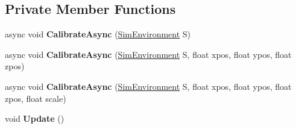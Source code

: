 \subsection*{Private Member Functions}
\begin{DoxyCompactItemize}
\item 
\mbox{\label{class_pozyx_positioner_1_1_framework_1_1_sim_object_ab0d578085cfad50b5e864a172b1254d0}} 
async void {\bfseries Calibrate\+Async} (\hyperlink{class_pozyx_positioner_1_1_framework_1_1_sim_environment}{Sim\+Environment} S)
\item 
\mbox{\label{class_pozyx_positioner_1_1_framework_1_1_sim_object_aa1039dc5dba70d15e26f6a98f8938501}} 
async void {\bfseries Calibrate\+Async} (\hyperlink{class_pozyx_positioner_1_1_framework_1_1_sim_environment}{Sim\+Environment} S, float xpos, float ypos, float zpos)
\item 
\mbox{\label{class_pozyx_positioner_1_1_framework_1_1_sim_object_abd6181d20432387f956e80632f2994cf}} 
async void {\bfseries Calibrate\+Async} (\hyperlink{class_pozyx_positioner_1_1_framework_1_1_sim_environment}{Sim\+Environment} S, float xpos, float ypos, float zpos, float scale)
\item 
\mbox{\label{class_pozyx_positioner_1_1_framework_1_1_sim_object_afe392c2a31003ef615127a8c00f6ed27}} 
void {\bfseries Update} ()
\end{DoxyCompactItemize}
